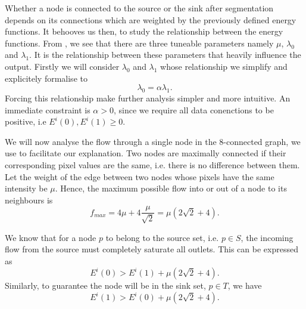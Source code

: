 \documentclass[10pt, journal, letterpaper, onecolumn, draftcls]{IEEEtran}
\begin{document}
Whether a node is connected to the source or the sink after segmentation depends on its connections which are weighted by the previously defined energy functions. It behooves us then, to study the relationship between the energy functions. From , we see that there are three tuneable parameters namely $\mu$, $\lambda_0$ and $\lambda_1$. It is the relationship between these parameters that heavily influence the output. Firstly we will consider $\lambda_0$ and $\lambda_1$ whose relationship we simplify and explicitely formalise to
\begin{equation}
	\lambda_0 = \alpha\lambda_1.
	\label{eq:l0l1dependancy}
\end{equation}
Forcing this relationship make further analysis simpler and more intuitive. An immediate constraint is $\alpha > 0$, since we require all data conenctions to be positive, i.e $E^i(0), E^i(1) \geq 0$.

We will now analyse the flow through a single node in the 8-connected graph, we use  to facilitate our explanation. Two nodes are maximally connected if their corresponding pixel values are the same, i.e. there is no difference between them. Let the weight of the edge between two nodes whose pixels have the same intensity be $\mu$. Hence, the maximum possible flow into or out of a node to its neighbours is
\begin{equation}
	f_{max} = 4\mu + 4\frac{\mu}{\sqrt{2}} = \mu \left( 2\sqrt{2} + 4\right).
	\label{eq:neighbourhoodsaturation}
\end{equation}

We know that for a node $p$ to belong to the source set, i.e. $ p \in S$, the incoming flow from the source must completely saturate all outlets. This can be expressed as
\begin{equation}
	E^i(0) > E^i(1) + \mu \left( 2\sqrt{2} + 4\right).
	\label{eq:sourcesaturation}
\end{equation}
Similarly, to guarantee the node will be in the sink set, $p \in T$, we have
\begin{equation}
	E^i(1) > E^i(0) + \mu \left( 2\sqrt{2} + 4\right).
	\label{eq:sinksaturation}
\end{equation}
\end{document}
